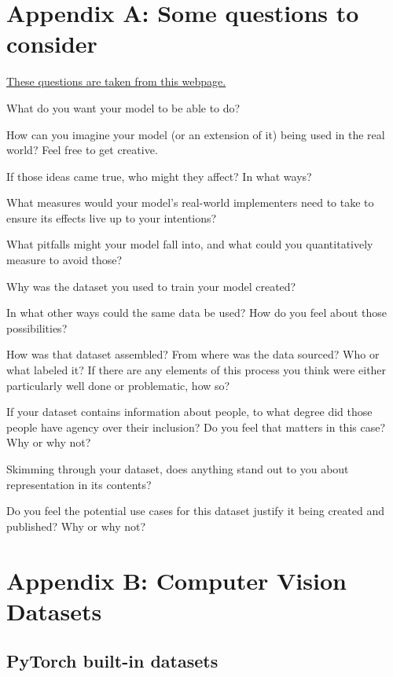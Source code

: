 \documentclass{tufte-handout}
\begin{document}
\section*{Appendix A: Some questions to consider}
\href{https://www.notion.so/ANN-Project-Framing-76e1b6af347f475a983487996ac9760d}{These questions are taken from this webpage.}
\bi
\item What do you want your model to be able to do?
\item How can you imagine your model (or an extension of it) being used in the real world? Feel free to get creative.
\item If those ideas came true, who might they affect? In what ways?
\item What measures would your model's real-world implementers need to take to ensure its effects live up to your intentions?
\item What pitfalls might your model fall into, and what could you quantitatively measure to avoid those?
\item Why was the dataset you used to train your model created?
\item In what other ways could the same data be used? How do you feel about those possibilities?
\item How was that dataset assembled? From where was the data sourced? Who or what labeled it? If there are any elements of this process you think were either particularly well done or problematic, how so?
\item If your dataset contains information about people, to what degree did those people have agency over their inclusion? Do you feel that matters in this case? Why or why not?
\item Skimming through your dataset, does anything stand out to you about representation in its contents?
\item Do you feel the potential use cases for this dataset justify it being created and published? Why or why not?
\ei

\section*{Appendix B: Computer Vision Datasets}
\subsection*{PyTorch built-in datasets}\label{pytorch-built-in-datasets}
\end{document}

